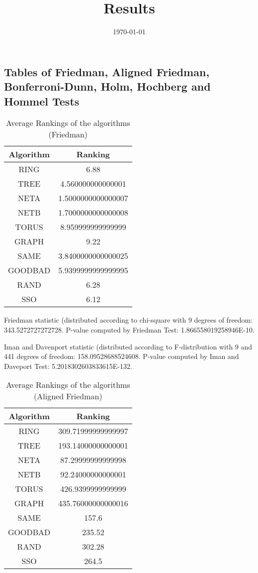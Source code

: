 \documentclass[a4paper,10pt]{article}
\title{Results}
\author{}
\date{\today}
\begin{document}
\begin{landscape}
\oddsidemargin 0in \topmargin 0in\maketitle
\section{Tables of Friedman, Aligned Friedman, Bonferroni-Dunn, Holm, Hochberg and Hommel Tests}
\begin{table}[!htp]
\centering
\caption{Average Rankings of the algorithms (Friedman)
}\begin{tabular}{c|c}
Algorithm&Ranking\\
\hline
 RING&6.88\\
 TREE&4.560000000000001\\
 NETA&1.5000000000000007\\
 NETB&1.7000000000000008\\
 TORUS&8.959999999999999\\
 GRAPH&9.22\\
 SAME&3.8400000000000025\\
 GOODBAD&5.9399999999999995\\
 RAND&6.28\\
 SSO&6.12\\
\end{tabular}
\end{table}


Friedman statistic (distributed according to chi-square with 9 degrees of freedom: 343.5272727272728. 
P-value computed by Friedman Test: 1.866558019258946E-10.\newline

Iman and Davenport statistic (distributed according to F-distribution with 9 and 441 degrees of freedom: 158.09528688524608. 
P-value computed by Iman and Daveport Test: 5.2018302603833615E-132.\newline


\newpage

\begin{table}[!htp]
\centering
\caption{Average Rankings of the algorithms (Aligned Friedman)
}\begin{tabular}{c|c}
Algorithm&Ranking\\
\hline
 RING&309.71999999999997\\
 TREE&193.14000000000001\\
 NETA&87.29999999999998\\
 NETB&92.24000000000001\\
 TORUS&426.9399999999999\\
 GRAPH&435.76000000000016\\
 SAME&157.6\\
 GOODBAD&235.52\\
 RAND&302.28\\
 SSO&264.5\\
\end{tabular}
\end{table}



\end{landscape}
\end{document}
